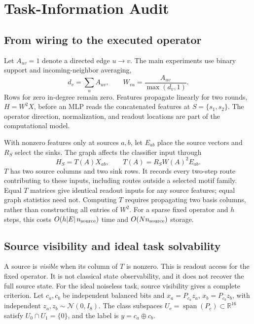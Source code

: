 \section{Task-Information Audit}
\label{sec:method}


\subsection{From wiring to the executed operator}
\label{sec:operator}

Let $A_{uv}=1$ denote a directed edge $u\!\to\!v$. The main experiments
use binary support and incoming-neighbor averaging,
\begin{equation}
 d_v=\sum_u A_{uv},\qquad
 W_{vu}=\frac{A_{uv}}{\max(d_v,1)}.
 \label{eq:operator}
\end{equation}
Rows for zero in-degree remain zero. Features propagate linearly for two
rounds, $H=W^2X$, before an MLP reads the concatenated features at
$S=\{s_1,s_2\}$. The operator direction, normalization, and readout
locations are part of the computational model.

With nonzero features only at sources $a,b$, let $E_{ab}$ place the source
vectors and $R_S$ select the sinks. The graph affects the classifier input
through
\begin{equation}
 H_S=T(A)X_{ab},\qquad T(A)=R_SW(A)^2E_{ab}.
 \label{eq:transfer}
\end{equation}
$T$ has two source columns and two sink rows. It records every two-step
route contributing to these inputs, including routes outside a selected
motif family. Equal $T$ matrices give identical readout inputs for any
source features; equal graph statistics need not. Computing $T$ requires
propagating two basis columns, rather than constructing all entries of
$W^2$. For a sparse fixed operator and $h$ steps, this costs
$O(h|E|\,n_{\rm source})$ time and $O(Nn_{\rm source})$ storage.

\subsection{Source visibility and ideal task solvability}
\label{sec:observability}

A source is \emph{visible} when its column of $T$ is nonzero. This is readout
access for the fixed operator. It is not classical state observability, and it
does not recover the full source state. For the ideal noiseless task, source
visibility gives a complete criterion.
Let $c_a,c_b$ be independent balanced bits and
$x_a=P_{c_a}z_a$, $x_b=P_{c_b}z_b$, with independent
$z_a,z_b\sim\mathcal N(0,I_8)$. The class subspaces
$U_c=\operatorname{span}(P_c)\subset\mathbb R^{16}$ satisfy
$U_0\cap U_1=\{0\}$, and the label is $y=c_a\oplus c_b$.

